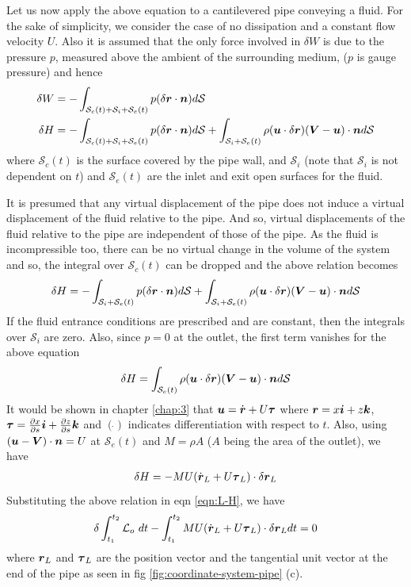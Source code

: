 \documentclass[12pt]{report}
\begin{document}
Let us now apply the above equation to a cantilevered pipe conveying a fluid. For the sake of simplicity, we consider the case of no dissipation and  a constant flow velocity $U$. Also it is assumed that the only force involved in $\delta W$ is due to the pressure $p$, measured above the ambient of the surrounding medium, ($p$ is gauge pressure) and hence
\begin{align*}
   \delta W &= - \int_{\mathcal{S}_c(t) + \mathcal{S}_i + \mathcal{S}_e(t)} p (\delta \vb*{r} \cdot \vb*{n}) d\mathcal{S} \\
   \delta H &= - \int_{\mathcal{S}_c(t) + \mathcal{S}_i + \mathcal{S}_e(t)} p (\delta \vb*{r} \cdot \vb*{n}) d\mathcal{S} + \int_{\mathcal{S}_i + \mathcal{S}_e(t)}\rho (\vb*{u}\cdot \delta \vb*{r}) (\vb*{V} - \vb*{u}) \cdot \vb*{n} d\mathcal{S}
\end{align*}
where $\mathcal{S}_c(t)$ is the surface covered by the pipe wall, and $\mathcal{S}_i$ (note that $\mathcal{S}_i$ is not dependent on $t$) and $\mathcal{S}_e(t)$ are the inlet and exit open surfaces for the fluid. 

It is presumed that any virtual displacement of the pipe does not induce a virtual displacement of the fluid relative to the pipe. And so, virtual displacements of the fluid relative to the pipe are independent of those of the pipe. As the fluid is incompressible too, there can be no virtual change in the volume of the system and so, the integral over $\mathcal{S}_c(t)$ can be dropped and the above relation becomes
\begin{align*}
\delta H = - \int_{\mathcal{S}_i + \mathcal{S}_e(t)} p (\delta \vb*{r} \cdot \vb*{n}) d\mathcal{S} + \int_{\mathcal{S}_i + \mathcal{S}_e(t)}\rho (\vb*{u}\cdot \delta \vb*{r}) (\vb*{V} - \vb*{u}) \cdot \vb*{n} d\mathcal{S}
\end{align*}
 If the fluid entrance conditions are prescribed and are constant, then the integrals over $\mathcal{S}_i$ are zero. Also, since $p=0$ at the outlet, the first term vanishes for the above equation
\begin{align*}
\delta H = \int_{\mathcal{S}_e(t)}\rho (\vb*{u}\cdot \delta \vb*{r}) (\vb*{V} - \vb*{u}) \cdot \vb*{n} d\mathcal{S}
\end{align*} 
It would be shown in chapter \ref{chap:3} that $\vb*{u} = \dot{\vb*{r}} + U\vb*{\tau}$ where $\vb*{r} = x\vb*{i} + z\vb*{k}$, $\vb*{\tau} = \pdv{x}{s}\vb*{i} + \pdv{z}{s} \vb*{k}$ and $(\dot{})$ indicates differentiation with respect to $t$. Also, using $(\vb*{u} - \vb*{V})\cdot \vb*{n} = U$ at $\mathcal{S}_e (t)$ and $M = \rho A$ ($A$ being the area of the outlet), we have
\begin{align*}
\delta H = - MU (\dot{\vb*{r}}_L + U\vb*{\tau}_L)\cdot \delta\vb*{r}_L 
\end{align*}
Substituting the above relation in eqn \ref{eqn:L-H}, we have 
\begin{align}
\delta \int_{t_1}^{t_2}\mathcal{L}_o~dt - \int_{t_1}^{t_2}  MU (\dot{\vb*{r}}_L + U\vb*{\tau}_L)\cdot \delta\vb*{r}_L  dt = 0 \label{eqn:Lo}
\end{align}
where $\vb*{r}_L$ and $\vb*{\tau}_L$ are the position vector and the tangential unit vector at the end of the pipe as seen in fig \ref{fig:coordinate-system-pipe} (c).
\end{document}
